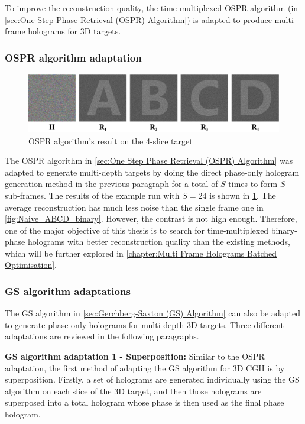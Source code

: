 To improve the reconstruction quality, the time-multiplexed OSPR algorithm (in \cref{sec:One Step Phase Retrieval (OSPR) Algorithm}) is adapted to produce multi-frame holograms for 3D targets.


\subsubsection{OSPR algorithm adaptation}
\begin{figure}[H]
	\centering
	\includegraphics[width=1.0\textwidth]{ABCD/OSPR_ABCD.pdf}
	\caption{OSPR algorithm's result on the 4-slice target}
	\label{fig:OSPR_ABCD}
\end{figure}

The OSPR algorithm in \cref{sec:One Step Phase Retrieval (OSPR) Algorithm} was adapted to generate multi-depth targets by doing the direct phase-only hologram generation method in the previous paragraph for a total of $S$ times to form $S$ sub-frames. The results of the example run with $S=24$ is shown in \cref{fig:OSPR_ABCD}. The average reconstruction has much less noise than the single frame one in \cref{fig:Naive_ABCD_binary}. However, the contrast is not high enough. Therefore, one of the major objective of this thesis is to search for time-multiplexed binary-phase holograms with better reconstruction quality than the existing methods, which will be further explored in \cref{chapter:Multi Frame Holograms Batched Optimisation}.

\subsubsection{GS algorithm adaptations} \label{sec:GS algorithm adaptation}
The GS algorithm in \cref{sec:Gerchberg-Saxton (GS) Algorithm} can also be adapted to generate phase-only holograms for multi-depth 3D targets. Three different adaptations are reviewed in the following paragraphs.

\textbf{GS algorithm adaptation 1 - Superposition: }
Similar to the OSPR adaptation, the first method of adapting the GS algorithm for 3D CGH is by superposition. Firstly, a set of holograms are generated individually using the GS algorithm on each slice of the 3D target, and then those holograms are superposed into a total hologram whose phase is then used as the final phase hologram.

